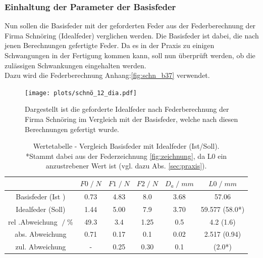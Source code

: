 \subsubsection{Einhaltung der Parameter der Basisfeder}
Nun sollen die Basisfeder mit der geforderten Feder aus der Federberechnung der
Firma Schnöring (Idealfeder) verglichen werden. Die Basisfeder ist dabei, die nach jenen
Berechnungen gefertigte Feder. Da es in der Praxis zu einigen Schwangungen in der
Fertigung kommen kann, soll nun überprüft werden, ob die zulässigen Schwankungen eingehalten werden.\\
Dazu wird die Federberechnung Anhang:\ref{fig:schn_b37} verwendet. 
\begin{figure}[H]
    \center
    \texttt{[image: plots/schnö\_12\_dia.pdf]}
    \caption{Dargestellt ist die geforderte Idealfeder nach Federberechnung der 
            Firma Schnöring im Vergleich mit der Basisfeder, welche nach diesen Berechnungen
            gefertigt wurde.
    }
    \label{fig:qual_basis}
\end{figure}

\begin{table}[H]
    \center
    \begin{tabular}{c |c c c c c}
        \toprule
        & $F0\;/\;N$ & $F1\;/\;N$ & $F2\;/\;N$ & $D_a\;/\;mm$ &$L0\;/\;mm$\\
        \midrule
        Basisfeder (Ist  )&0.73    &4.83   &8.0   &3.68  &57.06\\
        Idealfeder (Soll) &1.44    &5.00   &7.9   &3.70  &59.577 (58.0*)\\
        \midrule
        rel .Abweichung $\;/\;$\% &49.3 &3.4    &1.25  &0.5   &4.2 (1.6) \\
        abs. Abweichung        &0.71    &0.17   &0.1   &0.02  &2.517 (0.94)\\
        zul. Abweichung   &-       &0.25   &0.30  &0.1   &(2.0*)\\
        \bottomrule
    \end{tabular}
    \caption{Wertetabelle - Vergleich Basisfeder mit Idealfeder (Ist/Soll).\\
            *Stammt dabei aus der Federzeichnung \ref{fig:zeichnung}, da L0 ein
            anzustrebener Wert ist (vgl. dazu Abs. \ref{sec:praxis}).
    }
    \label{tab:vergleich}
\end{table}
\label{sec:einhaltung}
\newpage
